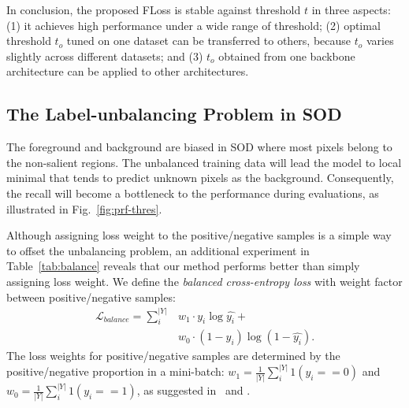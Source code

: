 \documentclass[10pt,twocolumn,letterpaper]{article}
\newcommand{\CheckRmv}[1]{}
\newcommand{\CheckRmv}[1]{#1}
\begin{document}
In conclusion, the proposed FLoss is stable against threshold $t$
in three aspects:
(1) it achieves high performance under a wide range of threshold;
%
(2) optimal threshold $t_o$ tuned on one dataset can be transferred to others,
because $t_o$ varies slightly across different datasets;
%
and (3) $t_o$ obtained from one backbone architecture can be applied to other architectures.

\subsection{The Label-unbalancing Problem in SOD}

\CheckRmv{
\begin{figure}
  \centering
  \texttt{[image: figures/prf-thres2]}
  \caption{{\color{red}{\textbf{Precision}}}, {\color{green}{\textbf{Recall}}},
    {\color{blue}{\textbf{F-measure}}} and Maximal F-measure ({\color{blue}{$\bullet$}})  of
    DSS (\textbf{- - -})
    and F-DSS (\textbf{---}) under different thresholds.
    DSS tends to predict unknown pixels as the
    majority class--the background, resulting in high precision but low recall.
    FLoss is able to find a better compromise between precision and recall.
  }\label{fig:prf-thres}
\end{figure}
}


The foreground and background are biased in SOD where
most pixels belong to the non-salient regions.
%
The unbalanced training data will lead the model to local minimal
that tends to predict unknown pixels as the background.
%
Consequently, the recall will become a bottleneck to the performance during evaluations,
as illustrated in Fig.~\ref{fig:prf-thres}.

Although assigning loss weight to the positive/negative samples is a simple way to
offset the unbalancing problem, an additional experiment in Table~\ref{tab:balance}
reveals that our method performs better than simply assigning loss weight.
%
We define the \emph{balanced cross-entropy loss} with weight factor between 
positive/negative samples:
\begin{equation}
  \begin{split}
  \mathcal{L}_{balance} = \sum\nolimits_i^{|Y|} &w_1 \cdot y_i\log{\hat{y_i}} + \\
                          &w_0 \cdot (1-y_i)\log{(1-\hat{y_i})}.
  \end{split}
  \label{eq:balance-cross-entropy}
\end{equation}
%
The loss weights for positive/negative samples are determined by the 
positive/negative proportion in a mini-batch:
$w_1 = \frac{1}{|Y|}\sum_i^{|Y|} 1(y_i\!==\!0)$ and $w_0 = \frac{1}{|Y|}\sum_i^{|Y|} 1(y_i\!==\!1)$,
as suggested in~\cite{xie2015holistically} and \cite{shen2015deepcontour}.
\end{document}
